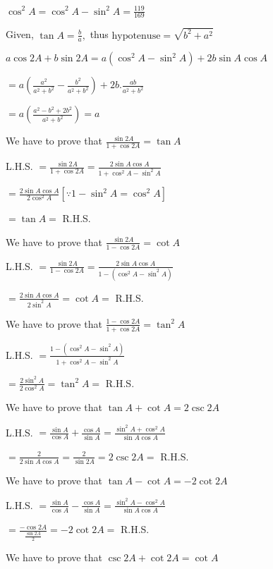     $\cos^2A = \cos^2A - \sin^2A = \frac{119}{169}$
  \stopitemize
\item Given, $\tan A = \frac{b}{a},$ thus $\text{hypotenuse} = \sqrt{b^2 + a^2}$

  $a\cos 2A+ b\sin 2A = a(\cos^2A - \sin^2A) + 2b\sin A\cos A$

  $= a\left(\frac{a^2}{a^2 + b^2} - \frac{b^2}{a^2 + b^2}\right) + 2b.\frac{ab}{a^2 + b^2}$

  $= a\left(\frac{a^2 - b^2 + 2b^2}{a^2 + b^2}\right) = a$

\item We have to prove that $\frac{\sin 2A}{1 + \cos 2A} = \tan A$

  L.H.S. $= \frac{\sin 2A}{1 + \cos 2A} = \frac{2\sin A\cos A}{1 + \cos^2A - \sin^2A}$

  $= \frac{2\sin A\cos A}{2\cos^2A}[\because 1 - \sin^2A = \cos^2A]$

  $= \tan A =$ R.H.S.

\item We have to prove that $\frac{\sin 2A}{1 - \cos 2A} = \cot A$

  L.H.S. $= \frac{\sin 2A}{1 - \cos 2A} = \frac{2\sin A\cos A}{1 -(\cos^2A - \sin^2A)}$

  $= \frac{2\sin A\cos A}{2\sin^2A} = \cot A =$ R.H.S.

\item We have to prove that $\frac{1 - \cos 2A}{1 + \cos 2A} = \tan^2A$

  L.H.S. $= \frac{1 - (\cos^2A - \sin^2A)}{1 + \cos^2A - \sin^2A}$

  $= \frac{2\sin^2A}{2\cos^2A} = \tan^2A =$ R.H.S.

\item We have to prove that $\tan A + \cot A = 2\csc 2A$

  L.H.S. $= \frac{\sin A}{\cos A} + \frac{\cos A}{\sin A} = \frac{\sin^2A + \cos^2A}{\sin A\cos A}$

  $= \frac{2}{2\sin A\cos A} = \frac{2}{\sin 2A} = 2\csc 2A =$ R.H.S.

\item We have to prove that $\tan A - \cot A = -2\cot2A$

  L.H.S. $= \frac{\sin A}{\cos A} - \frac{\cos A}{\sin A} = \frac{\sin^2A - \cos^2A}{\sin A\cos A}$

  $= \frac{-\cos2A}{\frac{\sin2A}{2}} = -2\cot2A =$ R.H.S.

\item We have to prove that $\csc 2A + \cot 2A = \cot A$

